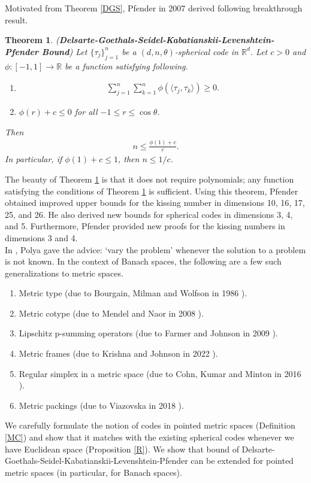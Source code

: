 \documentclass{amsart}
\newtheorem{theorem}{Theorem}[section]
\begin{document}
Motivated from Theorem \ref{DGS},   Pfender in 2007 derived following breakthrough result.
 \begin{theorem}  \cite{PFENDER} (\textbf{Delsarte-Goethals-Seidel-Kabatianskii-Levenshtein-Pfender Bound}) \label{PFENDERT}
 	Let $\{\tau_j\}_{j=1}^n$  be a  $(d,n,\theta )$-spherical code in $\mathbb{R}^d$. Let $c>0$ and $\phi:[-1,1]\to \mathbb{R}$ be a function satisfying following.
 	\begin{enumerate}[\upshape(i)]
 		\item 
 		\begin{align*}
 			\sum_{j=1}^n\sum_{k =1}^n\phi(\langle \tau_j, \tau_k\rangle)\geq 0.	
 		\end{align*}
 		\item $\phi(r)+c\leq 0$ for all $-1\leq r \leq \cos \theta$.
 	\end{enumerate}
 Then 
 \begin{align*}
 	n\leq \frac{\phi(1)+c}{c}.
 \end{align*}
In particular, if $\phi(1)+c\leq 1$, then $n\leq 1/c$.
 \end{theorem}
The beauty of Theorem \ref{PFENDERT} is that it does not require polynomials; any function satisfying the conditions of Theorem \ref{PFENDERT} is sufficient. Using this theorem, Pfender obtained improved upper bounds for the kissing number in dimensions 10, 16, 17, 25, and 26. He also derived new bounds for spherical codes in dimensions 3, 4, and 5. Furthermore, Pfender provided new proofs for the kissing numbers in dimensions 3 and 4.\\



In \cite{POLYA}, Polya gave the advice: ‘vary the problem’ whenever the solution to a problem is not known. In the context of Banach spaces, the following are a few such generalizations to metric spaces.
\begin{enumerate}[\upshape(i)]
	\item Metric type (due to Bourgain, Milman and Wolfson in 1986 \cite{BOURGAINMILMANWOLFSON}).
	\item Metric cotype (due to Mendel and Naor in 2008 \cite{MENDELNAOR}).
	\item Lipschitz p-summing operators (due to Farmer and Johnson in 2009 \cite{FARMERJOHNSON}).
	\item Metric frames (due to Krishna and Johnson in 2022 \cite{KRISHNAJOHNSON}).
	\item Regular simplex in a metric space (due to Cohn, Kumar and Minton in 2016 \cite{COHNKUMARMINTON}).
	\item Metric packings (due to Viazovska in 2018 \cite{VIAZOVSKA}).
\end{enumerate}
We carefully  formulate the notion of codes in pointed metric spaces (Definition \ref{MC}) and show that it matches with the existing spherical codes whenever we have Euclidean space (Proposition \ref{R}). We show that bound of Delsarte-Goethals-Seidel-Kabatianskii-Levenshtein-Pfender  can be extended for pointed metric spaces (in particular, for Banach spaces).
\end{document}
